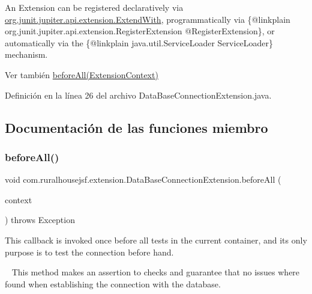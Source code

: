 An Extension can be registered {\ttfamily declaratively} via \mbox{\hyperlink{}{org.\+junit.\+jupiter.\+api.\+extension.\+Extend\+With}}, {\ttfamily programmatically} via \{@linkplain org.\+junit.\+jupiter.\+api.\+extension.\+Register\+Extension @\+Register\+Extension\}, or {\ttfamily automatically} via the \{@linkplain java.\+util.\+Service\+Loader Service\+Loader\} mechanism.

\begin{DoxySeeAlso}{Ver también}
\mbox{\hyperlink{classcom_1_1ruralhousejsf_1_1extension_1_1_data_base_connection_extension_ae1fe703d5f0bdd5f29f0f4b9f0645e3e}{before\+All(\+Extension\+Context)}} 
\end{DoxySeeAlso}


Definición en la línea 26 del archivo Data\+Base\+Connection\+Extension.\+java.



\subsection{Documentación de las funciones miembro}
\mbox{\label{classcom_1_1ruralhousejsf_1_1extension_1_1_data_base_connection_extension_ae1fe703d5f0bdd5f29f0f4b9f0645e3e}} 
\subsubsection{\texorpdfstring{beforeAll()}{beforeAll()}}
{\footnotesize\ttfamily void com.\+ruralhousejsf.\+extension.\+Data\+Base\+Connection\+Extension.\+before\+All (\begin{DoxyParamCaption}\item[{Extension\+Context}]{context }\end{DoxyParamCaption}) throws Exception}



This callback is invoked once {\ttfamily before} all tests in the current container, and its only purpose is to test the connection before hand. 

~\newline
 This method makes an assertion to checks and guarantee that no issues where found when establishing the connection with the database.



